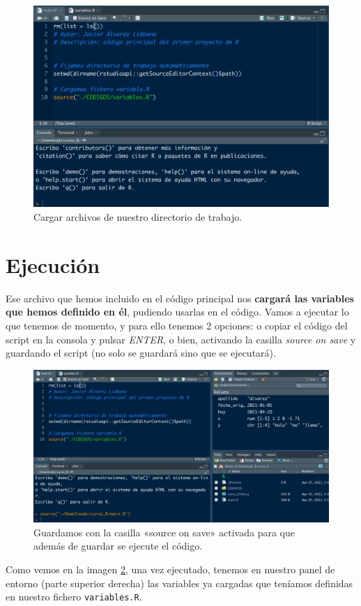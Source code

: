 \documentclass[11pt,]{book}
\begin{document}
\begin{figure}

{\centering \includegraphics[width=0.5\linewidth]{./img/menu_carpetas1} 

}

\caption{Cargar archivos de nuestro directorio de trabajo.}\label{fig:menu-carpetas1}
\end{figure}

\hypertarget{ejecuciuxf3n}{%
\section{Ejecución}\label{ejecuciuxf3n}}

Ese archivo que hemos incluido en el código principal nos \textbf{cargará las variables que hemos definido en él}, pudiendo usarlas en el código. Vamos a ejecutar lo que tenemos de momento, y para ello tenemos 2 opciones: o copiar el código del script en la consola y pulsar \emph{ENTER}, o bien, activando la casilla \emph{source on save} y guardando el script (no solo se guardará sino que se ejecutará).

\begin{figure}

{\centering \includegraphics[width=0.5\linewidth]{./img/source_on_save} 

}

\caption{Guardamos con la casilla «source on save» activada para que además de guardar se ejecute el código.}\label{fig:source-on-save}
\end{figure}

Como vemos en la imagen \ref{fig:source-on-save}, una vez ejecutado, tenemos en nuestro panel de entorno (parte superior derecha) las variables ya cargadas que teníamos definidas en nuestro fichero \texttt{variables.R}.
\end{document}
